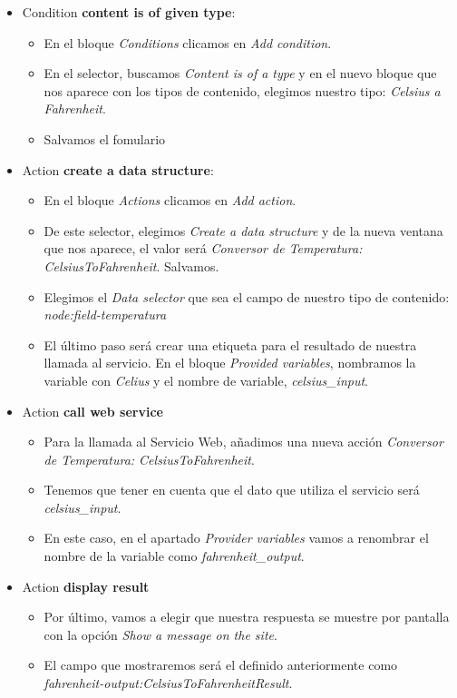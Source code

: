 \begin{itemize}
  \item Condition \textbf{content is of given type}:
  
  \begin{itemize}
    \item En el bloque \textit{Conditions} clicamos en \textit{Add condition}.
    \item En el selector, buscamos \textit{Content is of a type} y en el nuevo bloque que nos aparece con los 
    tipos de contenido, elegimos nuestro tipo: \textit{Celsius a Fahrenheit}.
    \item Salvamos el fomulario 
	\end{itemize}
	
  \item Action \textbf{create a data structure}:
  \begin{itemize}
    \item En el bloque \textit{Actions} clicamos en \textit{Add action}.
    \item De este selector, elegimos \textit{Create a data structure} y de la nueva ventana que nos aparece, 
    	el valor será \textit{Conversor de Temperatura: CelsiusToFahrenheit}. Salvamos.
  	\item Elegimos el \textit{Data selector} que sea el campo de nuestro tipo de contenido: \textit{node:field-temperatura}
	\item El último paso será crear una etiqueta para el resultado de nuestra llamada al servicio. En el 
    	 bloque \textit{Provided variables}, nombramos la variable con \textit{Celius} y el nombre de variable, \textit{celsius\_input}.
    \end{itemize}
  \item Action \textbf{call web service}
  \begin{itemize}
    \item Para la llamada al Servicio Web, añadimos una nueva acción \textit{Conversor de Temperatura: CelsiusToFahrenheit}.
    \item Tenemos que tener en cuenta que el dato que utiliza el servicio será \textit{celsius\_input}. 
    \item En este caso, en el apartado \textit{Provider variables} vamos a renombrar el nombre de la variable como 
    \textit{fahrenheit\_output}.
  \end{itemize}
  \item Action \textbf{display result}
  \begin{itemize}
    \item Por último, vamos a elegir que nuestra respuesta se muestre por pantalla con la opción \textit{Show a message on the site}.
    \item El campo que mostraremos será el definido anteriormente como \textit{fahrenheit-output:CelsiusToFahrenheitResult}.
  \end{itemize}
\end{itemize}

